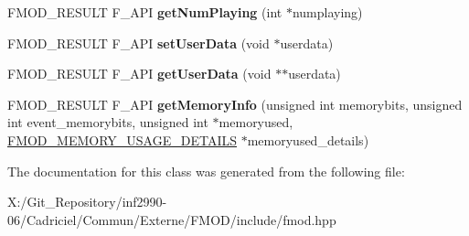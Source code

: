 \begin{DoxyCompactItemize}
\item 
\hypertarget{class_f_m_o_d_1_1_sound_group_af88057e101e4dd2268d1a6f6656db75b}{F\-M\-O\-D\-\_\-\-R\-E\-S\-U\-L\-T F\-\_\-\-A\-P\-I {\bfseries get\-Num\-Playing} (int $\ast$numplaying)}\label{class_f_m_o_d_1_1_sound_group_af88057e101e4dd2268d1a6f6656db75b}

\item 
\hypertarget{class_f_m_o_d_1_1_sound_group_a3315678b522baf2d74f732ab671f48c7}{F\-M\-O\-D\-\_\-\-R\-E\-S\-U\-L\-T F\-\_\-\-A\-P\-I {\bfseries set\-User\-Data} (void $\ast$userdata)}\label{class_f_m_o_d_1_1_sound_group_a3315678b522baf2d74f732ab671f48c7}

\item 
\hypertarget{class_f_m_o_d_1_1_sound_group_ac428e826a819030cbab7ffa666d7d9cd}{F\-M\-O\-D\-\_\-\-R\-E\-S\-U\-L\-T F\-\_\-\-A\-P\-I {\bfseries get\-User\-Data} (void $\ast$$\ast$userdata)}\label{class_f_m_o_d_1_1_sound_group_ac428e826a819030cbab7ffa666d7d9cd}

\item 
\hypertarget{class_f_m_o_d_1_1_sound_group_aab478a5f6edb8ef0eaf8d8fc70d1a448}{F\-M\-O\-D\-\_\-\-R\-E\-S\-U\-L\-T F\-\_\-\-A\-P\-I {\bfseries get\-Memory\-Info} (unsigned int memorybits, unsigned int event\-\_\-memorybits, unsigned int $\ast$memoryused, \hyperlink{struct_f_m_o_d___m_e_m_o_r_y___u_s_a_g_e___d_e_t_a_i_l_s}{F\-M\-O\-D\-\_\-\-M\-E\-M\-O\-R\-Y\-\_\-\-U\-S\-A\-G\-E\-\_\-\-D\-E\-T\-A\-I\-L\-S} $\ast$memoryused\-\_\-details)}\label{class_f_m_o_d_1_1_sound_group_aab478a5f6edb8ef0eaf8d8fc70d1a448}

\end{DoxyCompactItemize}


The documentation for this class was generated from the following file\-:\begin{DoxyCompactItemize}
\item 
X\-:/\-Git\-\_\-\-Repository/inf2990-\/06/\-Cadriciel/\-Commun/\-Externe/\-F\-M\-O\-D/include/fmod.\-hpp\end{DoxyCompactItemize}
